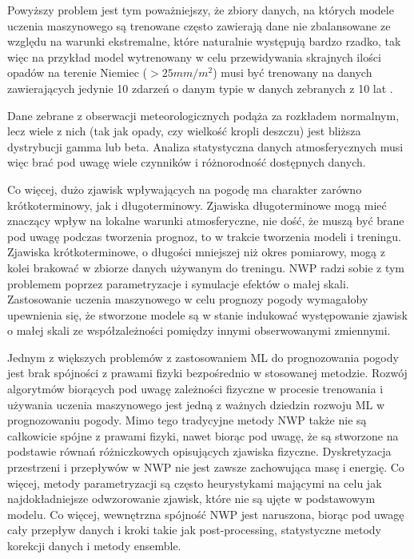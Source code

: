 Powyższy problem jest tym poważniejszy, że zbiory danych, na których modele uczenia maszynowego
są trenowane często zawierają dane nie zbalansowane ze względu na warunki ekstremalne, które naturalnie
występują bardzo rzadko, tak więc na przykład model wytrenowany w celu przewidywania
skrajnych ilości opadów na terenie Niemiec ($> 25mm/m^2$) musi być trenowany na danych 
zawierających jedynie 10 zdarzeń o danym typie w danych zebranych z 10 lat \cite{can-dl-beat-numerical}.

Dane zebrane z obserwacji meteorologicznych podąża za
rozkładem normalnym, lecz wiele z nich (tak jak opady, czy wielkość kropli deszczu) 
\cite{can-dl-beat-numerical} jest bliższa dystrybucji gamma lub beta. Analiza statystyczna
danych atmosferycznych musi więc brać pod uwagę wiele czynników i różnorodność dostępnych danych.

Co więcej, dużo zjawisk wpływających na pogodę ma charakter zarówno krótkoterminowy, jak i 
długoterminowy. Zjawiska długoterminowe mogą mieć znaczący wpływ na lokalne warunki atmosferyczne,
nie dość, że muszą być brane pod uwagę podczas tworzenia prognoz, to w trakcie tworzenia modeli
i treningu. Zjawiska krótkoterminowe, o długości mniejszej niż okres pomiarowy, mogą z kolei
brakować w zbiorze danych używanym do treningu. NWP radzi sobie z tym problemem poprzez 
parametryzacje i symulacje efektów o małej skali. Zastosowanie uczenia maszynowego
w celu prognozy pogody wymagałoby upewnienia się, że stworzone modele są w stanie 
indukować występowanie zjawisk o małej skali ze współzależności pomiędzy innymi obserwowanymi 
zmiennymi.

Jednym z większych problemów z zastosowaniem ML do prognozowania pogody jest brak spójności
z prawami fizyki bezpośrednio w stosowanej metodzie. Rozwój algorytmów biorących pod uwagę
zależności fizyczne w procesie trenowania i używania uczenia maszynowego jest jedną z ważnych dziedzin
rozwoju ML w prognozowaniu pogody. Mimo tego tradycyjne metody NWP także nie są całkowicie spójne
z prawami fizyki, nawet biorąc pod uwagę, że są stworzone na podstawie równań różniczkowych
opisujących zjawiska fizyczne. Dyskretyzacja przestrzeni i przepływów w NWP nie jest zawsze 
zachowująca masę i energię. Co więcej, metody parametryzacji są często heurystykami 
mającymi na celu jak najdokładniejsze odwzorowanie zjawisk, które nie są ujęte w podstawowym modelu.
Co więcej, wewnętrzna spójność NWP jest naruszona, biorąc pod uwagę cały przepływ
danych i kroki takie jak post-processing, statystyczne metody korekcji danych i metody 
ensemble.

